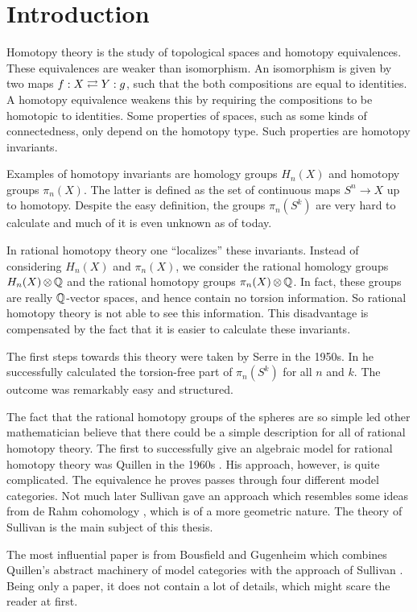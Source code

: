 
\chapter*{Introduction}

Homotopy theory is the study of topological spaces and homotopy equivalences. These equivalences are weaker than isomorphism. An isomorphism is given by two maps $f : X \rightleftarrows Y : g$, such that the both compositions are equal to identities. A homotopy equivalence weakens this by requiring the compositions to be homotopic to identities. Some properties of spaces, such as some kinds of connectedness, only depend on the homotopy type. Such properties are homotopy invariants. 

Examples of homotopy invariants are homology groups $H_n(X)$ and homotopy groups $\pi_n(X)$. The latter is defined as the set of continuous maps $S^n \to X$ up to homotopy. Despite the easy definition, the groups $\pi_n(S^k)$ are very hard to calculate and much of it is even unknown as of today.

In rational homotopy theory one ``localizes'' these invariants. Instead of considering $H_n(X)$ and $\pi_n(X)$, we consider the rational homology groups $H_n(X) \operatorname*{\otimes} \mathbb{Q}$ and the rational homotopy groups $\pi_n(X) \operatorname*{\otimes} \mathbb{Q}$. In fact, these groups are really $\mathbb{Q}$-vector spaces, and hence contain no torsion information. So rational homotopy theory is not able to see this information. This disadvantage is compensated by the fact that it is easier to calculate these invariants.

The first steps towards this theory were taken by Serre in the 1950s. In \cite{serre} he successfully calculated the torsion-free part of $\pi_n(S^k)$ for all $n$ and $k$. The outcome was remarkably easy and structured.

The fact that the rational homotopy groups of the spheres are so simple led other mathematician believe that there could be a simple description for all of rational homotopy theory. The first to successfully give an algebraic model for rational homotopy theory was Quillen in the 1960s \cite{quillen}. His approach, however, is quite complicated. The equivalence he proves passes through four different model categories. Not much later Sullivan gave an approach which resembles some ideas from de Rahm cohomology \cite{sullivan}, which is of a more geometric nature. The theory of Sullivan is the main subject of this thesis.

The most influential paper is from Bousfield and Gugenheim which combines Quillen's abstract machinery of model categories with the approach of Sullivan \cite{bousfield}. Being only a paper, it does not contain a lot of details, which might scare the reader at first.

